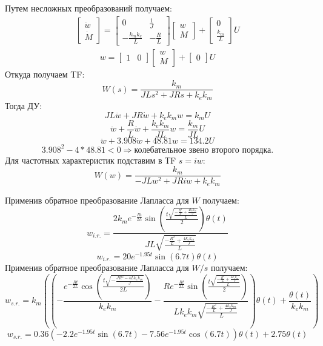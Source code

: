 \documentclass[16pt]{article}
\begin{document}
Путем несложных преобразований получаем:
\begin{align}
    \begin{bmatrix}
        \dot{w} \\
        \dot{M}
    \end{bmatrix}
    = 
    \begin{bmatrix}
        0 & \frac{1}{ J} \\
        -\frac{k_mk_e}{ L} & -\frac{R}{L}
    \end{bmatrix}
    \begin{bmatrix}
        w \\
        M
    \end{bmatrix}
    + 
    \begin{bmatrix}
        0 \\
        \frac{k_m}{L}
    \end{bmatrix}
    U
\end{align}
\begin{align}
    w 
    = 
    \begin{bmatrix}
        1 & 0
    \end{bmatrix}
    \begin{bmatrix}
        w \\
        M
    \end{bmatrix}
    + 
    \begin{bmatrix}
        0
    \end{bmatrix}
    U
\end{align}
Откуда получаем TF:
\[
    W(s) = \frac{k_m}{JLs^2 + JRs + k_ek_m}
\]
Тогда ДУ:
\[
    JL\ddot{w} + JR\dot{w} + k_ek_mw = k_mU
\]
\[
    \ddot{w} + \frac{R}{L}\dot{w} + \frac{k_ek_m}{JL}w = \frac{k_m}{JL}U
\]
\[
    \ddot{w} + 3.908\dot{w} + 48.81w = 134.2U
\]
\[
    3.908^2 - 4*48.81 < 0 \Rightarrow \text{колебательное звено второго порядка}.
\]
Для частотных характеристик подставим в ТF \(s = iw\):
\[
    W(w) = \frac{k_m}{-JLw^2 + JRiw + k_ek_m}
\]

Применив обратное преобразование Лапласса для \(W\) получаем:
\[w_{i.r.} = \frac{2 k_{m} e^{- \frac{R t}{2 L}} \sin{\left(\frac{t \sqrt{\frac{- \frac{R^{2}}{L} + \frac{4 k_{e} k_{m}}{J}}{L}}}{2} \right)} \theta\left(t\right)}{J L \sqrt{\frac{- \frac{R^{2}}{L} + \frac{4 k_{e} k_{m}}{J}}{L}}}\]
\[w_{i.r.} = 20 e^{- 1.95 t} \sin{\left(6.7 t \right)} \theta\left(t\right)\]
Применив обратное преобразование Лапласса для \(W / s\) получаем:
\[w_{s.r.} = k_{m} \left(\left(- \frac{e^{- \frac{R t}{2 L}} \cos{\left(\frac{t \sqrt{- \frac{J R^{2} - 4 L k_{e} k_{m}}{J}}}{2 L} \right)}}{k_{e} k_{m}} - \frac{R e^{- \frac{R t}{2 L}} \sin{\left(\frac{t \sqrt{\frac{- \frac{R^{2}}{L} + \frac{4 k_{e} k_{m}}{J}}{L}}}{2} \right)}}{L k_{e} k_{m} \sqrt{\frac{- \frac{R^{2}}{L} + \frac{4 k_{e} k_{m}}{J}}{L}}}\right) \theta\left(t\right) + \frac{\theta\left(t\right)}{k_{e} k_{m}}\right)\]
\[w_{s.r.} = 0.36 \left(- 2.2 e^{- 1.95 t} \sin{\left(6.7 t \right)} - 7.56 e^{- 1.95 t} \cos{\left(6.7 t \right)}\right) \theta\left(t\right) + 2.75 \theta\left(t\right)\]
\end{document}
